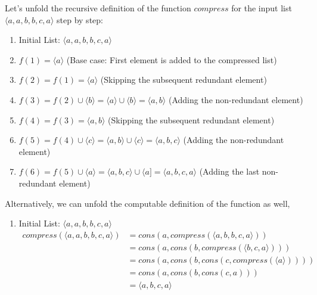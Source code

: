 \documentclass[12pt]{article}
\begin{document}
\begin{spacing}{1.5}
\begin{enumerate}
		      Let's unfold the recursive definition of the function $compress$ for the input list $\langle a, a, b, b, c, a \rangle$ step by step:
		      		      
		      \begin{enumerate}
		      	\item Initial List: $\langle a, a, b, b, c, a \rangle$
		      	      		      	      
		      	\item $f(1) = \langle a \rangle$ (Base case: First element is added to the compressed list)
		      	      		      	      
		      	\item $f(2) = f(1) = \langle a \rangle$ (Skipping the subsequent redundant element)
		      	      		      	      
		      	\item $f(3) = f(2) \cup \langle b \rangle = \langle a \rangle \cup \langle b \rangle = \langle a, b \rangle$ (Adding the non-redundant element)
		      	      		      	      
		      	\item $f(4) = f(3) = \langle a, b \rangle$ (Skipping the subsequent redundant element)
		      	      		      	      
		      	\item $f(5) = f(4) \cup \langle c \rangle = \langle a, b \rangle \cup \langle c \rangle = \langle a, b, c \rangle$ (Adding the non-redundant element)
		      	      		      	      
		      	\item $f(6) = f(5) \cup \langle a \rangle = \langle a, b, c \rangle \cup \langle a] = \langle a, b, c, a \rangle$ (Adding the last non-redundant element)
		      \end{enumerate}
		      
		      Alternatively, we can unfold the computable definition of the function as well,
		      
		      \begin{enumerate}
		      	\item Initial List: $\langle a, a, b, b, c, a \rangle$
		      	      \begin{align*}
		      	      	compress(\langle a, a, b, b, c, a \rangle) & = cons(a, compress(\langle a, b, b, c, a \rangle))       \\
                           & = cons(a, cons(b, compress(\langle b, c, a \rangle)))    \\
                           & = cons(a, cons(b, cons(c, compress(\langle a \rangle)))) \\
                           & = cons(a, cons(b, cons(c, a)))                           \\
                           & = \langle a, b, c, a \rangle                             
		      	      \end{align*}
		      	                      

\end{enumerate}
\end{enumerate}
\end{spacing}
\end{document}
